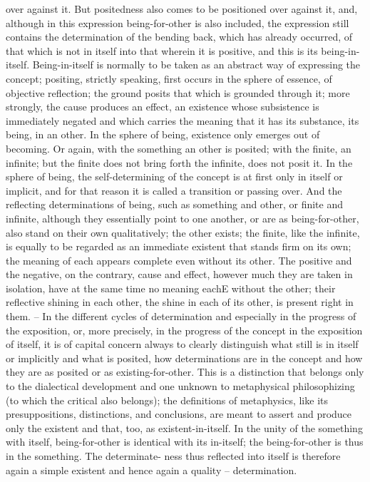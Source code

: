 over against it. But positedness also comes to be positioned over against
it, and, although in this expression being-for-other is also included, the
expression still contains the determination of the bending back, which
has already occurred, of that which is not in itself into that wherein it is
positive, and this is its being-in-itself. Being-in-itself is normally to be taken
as an abstract way of expressing the concept; positing, strictly speaking, first
occurs in the sphere of essence, of objective reflection; the ground posits
that which is grounded through it; more strongly, the cause produces an
effect, an existence whose subsistence is immediately negated and which
carries the meaning that it has its substance, its being, in an other. In the
sphere of being, existence only emerges out of becoming. Or again, with
the something an other is posited; with the finite, an infinite; but the finite
does not bring forth the infinite, does not posit it. In the sphere of being,
the self-determining of the concept is at first only in itself or implicit, and
for that reason it is called a transition or passing over. And the reflecting
determinations of being, such as something and other, or finite and infinite,
although they essentially point to one another, or are as being-for-other,
also stand on their own qualitatively; the other exists; the finite, like the
infinite, is equally to be regarded as an immediate existent that stands firm
on its own; the meaning of each appears complete even without its other.
The positive and the negative, on the contrary, cause and effect, however
much they are taken in isolation, have at the same time no meaning eachE
without the other; their reflective shining in each other, the shine in each of
its other, is present right in them. – In the different cycles of determination
and especially in the progress of the exposition, or, more precisely, in the
progress of the concept in the exposition of itself, it is of capital concern
always to clearly distinguish what still is in itself or implicitly and what is
posited, how determinations are in the concept and how they are as posited
or as existing-for-other. This is a distinction that belongs only to the
dialectical development and one unknown to metaphysical philosophizing
(to which the critical also belongs); the definitions of metaphysics, like
its presuppositions, distinctions, and conclusions, are meant to assert and
produce only the existent and that, too, as existent-in-itself.
In the unity of the something with itself, being-for-other is identical with
its in-itself; the being-for-other is thus in the something. The determinate-
ness thus reflected into itself is therefore again a simple existent and hence
again a quality – determination.

